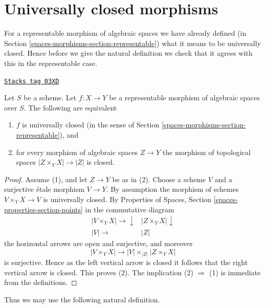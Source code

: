 \section{Universally closed morphisms}
\label{spaces-morphisms-section-universally-closed}
For a representable morphism of algebraic spaces we have already defined (in
Section \ref{spaces-morphisms-section-representable})
what it means to be universally closed. Hence before we give the natural
definition we check that it agrees with this in the representable case.

\begin{lemma}
\label{spaces-morphisms-lemma-characterize-representable-universally-closed}
\href{https://stacks.math.columbia.edu/tag/03XD}{\texttt{Stacks tag 03XD}}

Let $S$ be a scheme. Let $f : X \to Y$ be a representable morphism of
algebraic spaces over $S$. The following are equivalent
\begin{enumerate}
\item $f$ is universally closed
(in the sense of Section \ref{spaces-morphisms-section-representable}), and
\item for every morphism of algebraic spaces $Z \to Y$ the morphism of
topological spaces $|Z \times_Y X| \to |Z|$ is closed.
\end{enumerate}
\end{lemma}

\begin{proof}
Assume (1), and let $Z \to Y$ be as in (2). Choose a scheme $V$ and
a surjective \'etale morphism $V \to Y$. By assumption the morphism
of schemes $V \times_Y X \to V$ is universally closed. By
Properties of Spaces, Section \ref{spaces-properties-section-points}
in the commutative diagram
$$
\begin{array}{cc}|V \times_Y X| \longrightarrow\downarrow & |Z \times_Y X| \downarrow \\ |V| \longrightarrow & |Z|\end{array}
$$
the horizontal arrows are open and surjective, and moreover
$$
|V \times_Y X| \longrightarrow |V| \times_{|Z|} |Z \times_Y X|
$$
is surjective. Hence as the left
vertical arrow is closed it follows that the right vertical arrow is
closed. This proves (2). The implication (2) $\Rightarrow$ (1) is
immediate from the definitions.
\end{proof}

Thus we may use the following natural definition.

